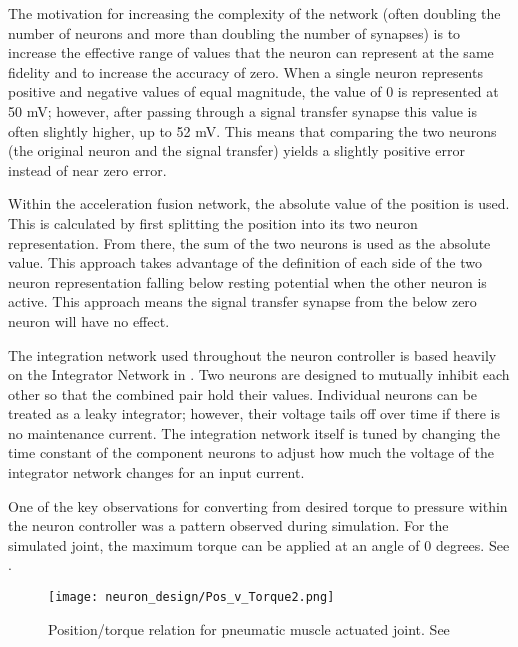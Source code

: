 The motivation for increasing the complexity of the
network (often doubling the number of neurons and more than doubling the number of synapses) is to increase the
effective range of values that the neuron can represent at the same fidelity and
to increase the accuracy of zero. When a single neuron represents positive and
negative values of equal magnitude, the value of 0 is represented at 50 mV; 
however, after passing through a signal transfer synapse this value is often
slightly higher, up to 52 mV. This means that comparing the two neurons (the
original neuron and the signal transfer) yields a slightly positive error
instead of near zero error.



Within the acceleration fusion network, the absolute value of the position is
used. This is calculated by first splitting the position into its two neuron
representation. From there, the sum of the two neurons is used as the absolute
value. This approach takes advantage of the definition of each side of the two neuron
representation falling below resting potential when the other neuron is active.
This approach means the signal transfer synapse from the below zero neuron will have no
effect.


The integration network used throughout the neuron controller is based heavily
on the Integrator Network in \cite{NickFunctionalSubnetwork}. Two neurons are
designed to mutually inhibit each other so that the combined pair hold their
values. Individual neurons can be treated as a leaky integrator; however, their
voltage tails off over time if there is no maintenance current. The integration
network itself is tuned by changing the time constant of the component neurons
to adjust how much the voltage of the integrator network changes for an input
current.


One of the key observations for converting from desired torque to pressure 
within the neuron controller was a pattern observed during simulation. For the
simulated joint, the maximum torque can be applied at an angle of 0 degrees. See .

\begin{figure}
\centering
\texttt{[image: neuron\_design/Pos\_v\_Torque2.png]}
\caption{Position/torque relation for pneumatic muscle actuated joint. See }
\label{fig:PositionTorque}
\end{figure}

